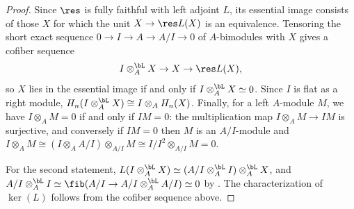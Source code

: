 	\begin{proof}
		Since $\res$ is fully faithful with left adjoint $L$, its essential image consists of those $X$ for which the unit $X \to \res L(X)$ is an equivalence. Tensoring the short exact sequence $0 \to I \to A \to A/I \to 0$ of $A$-bimodules with $X$ gives a cofiber sequence
		\[
			I \otimes^{\bL}_A X \to X \to \res L(X),
		\]
		so $X$ lies in the essential image if and only if $I \otimes^{\bL}_A X \simeq 0$. Since $I$ is flat as a right module, $H_n(I \otimes^{\bL}_A X) \cong I \otimes_A H_n(X)$. Finally, for a left $A$-module $M$, we have $I \otimes_A M = 0$ if and only if $IM = 0$: the multiplication map $I \otimes_A M \to IM$ is surjective, and conversely if $IM = 0$ then $M$ is an $A/I$-module and $I \otimes_A M \cong (I \otimes_A A/I) \otimes_{A/I} M \cong I/I^2 \otimes_{A/I} M = 0$.

		For the second statement, $L(I \otimes^{\bL}_A X) \simeq (A/I \otimes^{\bL}_A I) \otimes^{\bL}_A X$, and $A/I \otimes^{\bL}_A I \simeq \fib(A/I \to A/I \otimes^{\bL}_A A/I) \simeq 0$ by . The characterization of $\ker(L)$ follows from the cofiber sequence above.
	\end{proof}

